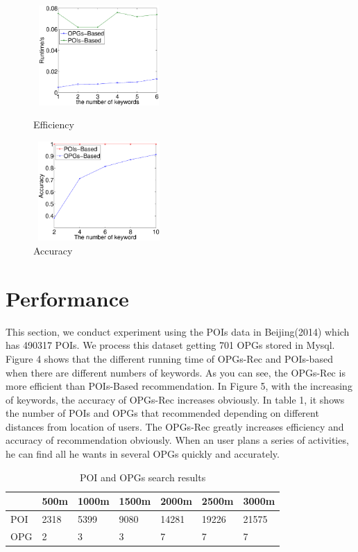 \documentclass[envcountreset,oribibl]{llncs}
\begin{document}
\begin{figure}
	\begin{minipage}[t]{0.5\linewidth}
		\centering
		\includegraphics[width=5cm, height = 3.8cm]{pics/figure1.eps}
		\caption{Efficiency}
		\label{fig:1}
	\end{minipage}
	\begin{minipage}[t]{0.5\linewidth}
		\centering
		\includegraphics[width=5cm, height = 3.8cm]{pics/figure3.eps}
		\caption{Accuracy}
		\label{fig:1}
	\end{minipage}
\end{figure}


\section{Performance}\label{sec:demon}
This section, we conduct experiment using the POIs data in Beijing(2014) which has 490317 POIs. We process this dataset getting 701 OPGs stored in Mysql. Figure 4 shows that the different running time of OPGs-Rec and POIs-based when there are different numbers of keywords.  As you can see, the OPGs-Rec is more efficient than POIs-Based recommendation. In Figure 5, with the increasing of keywords, the accuracy of OPGs-Rec increases obviously. In table 1, it shows the number of POIs and OPGs that recommended depending on different distances from location of users. The OPGs-Rec greatly increases efficiency and accuracy of recommendation obviously. When an user plans a series of activities, he can find all he wants in several OPGs quickly and accurately.
\begin{table}[!h]
	\centering
	\caption{POI and OPGs search results}
	\label{number of sub-tra}
	\begin{small}
		\begin{tabular}{p{1cm}|p{1.5cm}|p{1.5cm}|p{1.5cm}|p{1.5cm}|p{1.5cm}|p{1.5cm}}
			\hline
			 & 500m & 1000m & 1500m & 2000m &2500m & 3000m\\ \hline
			POI & 2318 & 5399 & 9080 & 14281 & 19226 & 21575 \\\hline
			OPG & 2 & 3 & 3 & 7 & 7 & 7\\\hline
		\end{tabular}
	\end{small}
\end{table}
 
\end{document}
